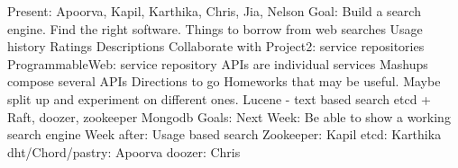 \documentclass[12pt]{article}
\begin{document}
\begin{outline}[enumerate]
\1 Present: Apoorva, Kapil, Karthika, Chris, Jia, Nelson
\1 Goal: Build a search engine. Find the right software.
\1 Things to borrow from web searches
\2 Usage history
\2 Ratings
\2 Descriptions
\1 Collaborate with Project2: service repositories
\2 ProgrammableWeb: service repository
\3 APIs are individual services
\3 Mashups compose several APIs
\1 Directions to go
\2 Homeworks that may be useful. Maybe split up and experiment on
different ones.
\3 Lucene - text based search
\3 etcd + Raft, doozer, zookeeper
\2 Mongodb
\1 Goals:
\2 Next Week: Be able to show a working search engine
\3 Week after: Usage based search
\2 Zookeeper: Kapil
\2 etcd: Karthika
\2 dht/Chord/pastry: Apoorva
\2 doozer: Chris
\end{outline}
\end{document}
